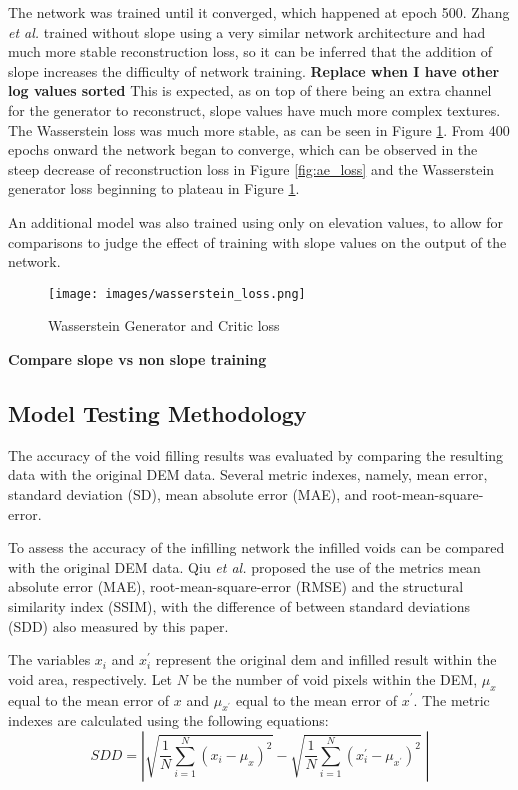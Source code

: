 \documentclass[twocolumn]{article}
\begin{document}
The network was trained until it converged, which happened at epoch 500.
Zhang \emph{et al.}\autocite{zhangVoidFillingBased2020} trained without slope using a very similar network architecture and had much more stable reconstruction loss, so it can be inferred that the addition of slope increases the difficulty of network training. \textbf{Replace when I have other log values sorted}
This is expected, as on top of there being an extra channel for the generator to reconstruct, slope values have much more complex textures.
The Wasserstein loss was much more stable, as can be seen in Figure \ref{fig:wasserstein_loss}.
From 400 epochs onward the network began to converge, which can be observed in the steep decrease of reconstruction loss in Figure \ref{fig:ae_loss} and the Wasserstein generator loss beginning to plateau in Figure \ref{fig:wasserstein_loss}.

An additional model was also trained using only on elevation values, to allow for comparisons to judge the effect of training with slope values on the output of the network.

\begin{figure}[htbp]
\centering
\texttt{[image: images/wasserstein\_loss.png]}
\caption{\label{fig:wasserstein_loss}Wasserstein Generator and Critic loss}
\end{figure}

\textbf{Compare slope vs non slope training}

\subsection{Model Testing Methodology}
\label{sec:orgb5078de}

The accuracy of the void filling results was evaluated by comparing the resulting data with the original DEM data.
Several metric indexes, namely, mean error, standard deviation (SD), mean absolute error (MAE), and root-mean-square-error.

To assess the accuracy of the infilling network the infilled voids can be compared with the original DEM data.
Qiu \emph{et al.}\autocite{qiuVoidFillingDigital2019} proposed the use of the metrics mean absolute error (MAE), root-mean-square-error (RMSE) and the structural similarity index (SSIM)\autocite{wangImageQualityAssessment2004}, with the difference of between standard deviations (SDD) also measured by this paper.

The variables \(x_i\) and \(x^\prime_i\) represent the original dem and infilled result within the void area, respectively.
Let \(N\) be the number of void pixels within the DEM, \(\mu_x\) equal to the mean error of \(x\) and \(\mu_{x^\prime}\) equal to the mean error of \(x^\prime\).
The metric indexes are calculated using the following equations:
\begin{equation}
SDD = \left\lvert \sqrt{ \frac{1}{N} \sum_{i=1}^N (x_i - \mu_x)^2 }  -  \sqrt{\frac{1}{N} \sum_{i=1}^N (x^\prime_i - \mu_{x^\prime})^2} \; \right\rvert
\end{equation}
\end{document}
